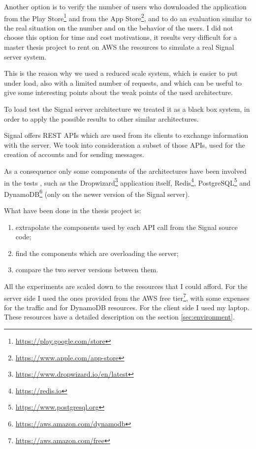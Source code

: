Another option is to verify the number of users who downloaded the application from the Play Store\footnote{\url{https://play.google.com/store}} and from the App Store\footnote{\url{https://www.apple.com/app-store}}, and to do an evaluation similar to the real situation on the number and on the behavior of the users.
I did not choose this option for time and cost motivations, it results very difficult for a master thesis project to rent on AWS the resources to simulate a real Signal server system.

This is the reason why we used a reduced scale system, which is easier to put under load, also with a limited number of requests, and which can be useful to give some interesting points about the weak points of the used architecture.

To load test the Signal server architecture we treated it as a black box system, in order to apply the possible results to other similar architectures.

Signal offers REST APIs which are used from its clients to exchange information with the server. We took into consideration a subset of those APIs, used for the creation of accounts and for sending messages.

As a consequence only some components of the architectures have been involved in the tests \parencite{read_2021,cocorada_2018}, such as the Dropwizard\footnote{\url{https://www.dropwizard.io/en/latest}} application itself, Redis\footnote{\url{https://redis.io}}, PostgreSQL\footnote{\url{https://www.postgresql.org}} and DynamoDB\footnote{\url{https://aws.amazon.com/dynamodb}} (only on the newer version of the Signal server).

\clearpage

What have been done in the thesis project is:
\begin{enumerate}
    \item extrapolate the components used by each API call from the Signal source code;
    \item find the components which are overloading the server;
    \item compare the two server versions between them.
\end{enumerate}

All the experiments are scaled down to the resources that I could afford.
For the server side I used the ones provided from the AWS free tier\footnote{\url{https://aws.amazon.com/free}}, with some expenses for the traffic and for DynamoDB resources.
For the client side I used my laptop.
These resources have a detailed description on the section \vref{sec:environment}.

